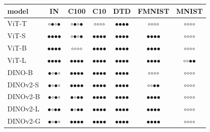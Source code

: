 \begin{table}[H]
\centering
\small
\setlength{\tabcolsep}{5pt}
\begin{tabular}{lcccccc}
\toprule
model & IN & C100 & C10 & DTD & FMNIST & MNIST \\
\midrule
ViT-T & $\circ$$\bullet$$\circ$$\bullet$ & $\circ$$\bullet$$\circ$$\bullet$ & $\circ$$\circ$$\circ$$\circ$ & $\bullet$$\bullet$$\bullet$$\bullet$ & $\circ$$\circ$$\circ$$\circ$ & $\circ$$\circ$$\circ$$\circ$ \\
ViT-S & $\bullet$$\bullet$$\bullet$$\bullet$ & $\circ$$\bullet$$\circ$$\bullet$ & $\bullet$$\bullet$$\bullet$$\bullet$ & $\bullet$$\bullet$$\bullet$$\bullet$ & $\bullet$$\bullet$$\bullet$$\bullet$ & $\circ$$\circ$$\circ$$\circ$ \\
ViT-B & $\bullet$$\bullet$$\bullet$$\bullet$ & $\circ$$\circ$$\circ$$\circ$ & $\bullet$$\bullet$$\bullet$$\bullet$ & $\bullet$$\bullet$$\bullet$$\bullet$ & $\bullet$$\bullet$$\bullet$$\bullet$ & $\circ$$\circ$$\circ$$\circ$ \\
ViT-L & $\bullet$$\bullet$$\bullet$$\bullet$ & $\bullet$$\bullet$$\bullet$$\bullet$ & $\bullet$$\bullet$$\bullet$$\bullet$ & $\bullet$$\bullet$$\bullet$$\bullet$ & $\bullet$$\bullet$$\bullet$$\bullet$ & $\circ$$\circ$$\bullet$$\bullet$ \\
\midrule
DINO-B & $\bullet$$\circ$$\bullet$$\circ$ & $\bullet$$\bullet$$\bullet$$\bullet$ & $\bullet$$\bullet$$\bullet$$\bullet$ & $\bullet$$\bullet$$\bullet$$\bullet$ & $\circ$$\circ$$\circ$$\circ$ & $\circ$$\circ$$\circ$$\circ$ \\
DINOv2-S & $\bullet$$\circ$$\bullet$$\circ$ & $\bullet$$\bullet$$\bullet$$\bullet$ & $\bullet$$\bullet$$\bullet$$\bullet$ & $\bullet$$\bullet$$\bullet$$\bullet$ & $\circ$$\circ$$\bullet$$\bullet$ & $\circ$$\circ$$\circ$$\circ$ \\
DINOv2-B & $\bullet$$\circ$$\bullet$$\circ$ & $\bullet$$\circ$$\bullet$$\bullet$ & $\bullet$$\bullet$$\bullet$$\bullet$ & $\bullet$$\bullet$$\bullet$$\bullet$ & $\bullet$$\bullet$$\bullet$$\bullet$ & $\circ$$\circ$$\circ$$\circ$ \\
DINOv2-L & $\bullet$$\circ$$\bullet$$\bullet$ & $\bullet$$\circ$$\bullet$$\bullet$ & $\bullet$$\bullet$$\bullet$$\bullet$ & $\bullet$$\bullet$$\bullet$$\bullet$ & $\bullet$$\bullet$$\bullet$$\bullet$ & $\circ$$\circ$$\circ$$\circ$ \\
DINOv2-G & $\bullet$$\circ$$\bullet$$\circ$ & $\bullet$$\bullet$$\bullet$$\bullet$ & $\bullet$$\bullet$$\bullet$$\bullet$ & $\bullet$$\bullet$$\bullet$$\bullet$ & $\bullet$$\bullet$$\bullet$$\bullet$ & $\circ$$\circ$$\circ$$\circ$ \\

\end{tabular}
\end{table}
